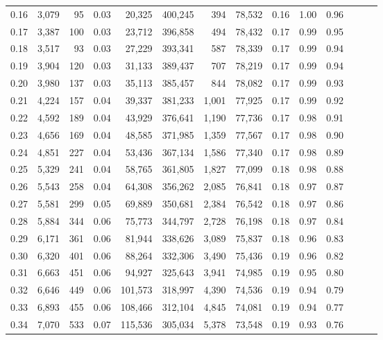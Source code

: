\begin{tabular}{rrrrrrrrrrrrrr}
0.16 &  3,079 &     95 &  0.03 &   20,325 &  400,245 &     394 &  78,532 &  0.16 &  1.00 &      0.96 \\
0.17 &  3,387 &    100 &  0.03 &   23,712 &  396,858 &     494 &  78,432 &  0.17 &  0.99 &      0.95 \\
0.18 &  3,517 &     93 &  0.03 &   27,229 &  393,341 &     587 &  78,339 &  0.17 &  0.99 &      0.94 \\
0.19 &  3,904 &    120 &  0.03 &   31,133 &  389,437 &     707 &  78,219 &  0.17 &  0.99 &      0.94 \\
0.20 &  3,980 &    137 &  0.03 &   35,113 &  385,457 &     844 &  78,082 &  0.17 &  0.99 &      0.93 \\
0.21 &  4,224 &    157 &  0.04 &   39,337 &  381,233 &   1,001 &  77,925 &  0.17 &  0.99 &      0.92 \\
0.22 &  4,592 &    189 &  0.04 &   43,929 &  376,641 &   1,190 &  77,736 &  0.17 &  0.98 &      0.91 \\
0.23 &  4,656 &    169 &  0.04 &   48,585 &  371,985 &   1,359 &  77,567 &  0.17 &  0.98 &      0.90 \\
0.24 &  4,851 &    227 &  0.04 &   53,436 &  367,134 &   1,586 &  77,340 &  0.17 &  0.98 &      0.89 \\
0.25 &  5,329 &    241 &  0.04 &   58,765 &  361,805 &   1,827 &  77,099 &  0.18 &  0.98 &      0.88 \\
0.26 &  5,543 &    258 &  0.04 &   64,308 &  356,262 &   2,085 &  76,841 &  0.18 &  0.97 &      0.87 \\
0.27 &  5,581 &    299 &  0.05 &   69,889 &  350,681 &   2,384 &  76,542 &  0.18 &  0.97 &      0.86 \\
0.28 &  5,884 &    344 &  0.06 &   75,773 &  344,797 &   2,728 &  76,198 &  0.18 &  0.97 &      0.84 \\
0.29 &  6,171 &    361 &  0.06 &   81,944 &  338,626 &   3,089 &  75,837 &  0.18 &  0.96 &      0.83 \\
0.30 &  6,320 &    401 &  0.06 &   88,264 &  332,306 &   3,490 &  75,436 &  0.19 &  0.96 &      0.82 \\
0.31 &  6,663 &    451 &  0.06 &   94,927 &  325,643 &   3,941 &  74,985 &  0.19 &  0.95 &      0.80 \\
0.32 &  6,646 &    449 &  0.06 &  101,573 &  318,997 &   4,390 &  74,536 &  0.19 &  0.94 &      0.79 \\
0.33 &  6,893 &    455 &  0.06 &  108,466 &  312,104 &   4,845 &  74,081 &  0.19 &  0.94 &      0.77 \\
0.34 &  7,070 &    533 &  0.07 &  115,536 &  305,034 &   5,378 &  73,548 &  0.19 &  0.93 &      0.76 \\

\end{tabular}
